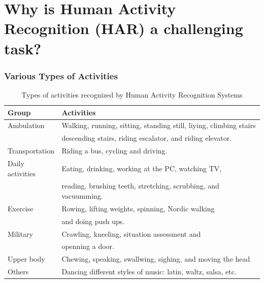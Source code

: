 \documentclass[
first,
ETH1,
navigation
]{ETHbeamerclass}
\begin{document}
\section{Why is Human Activity Recognition (HAR) a challenging task?} %

% 
% 


\begin{frame}
\frametitle{Various Types of Activities}

\begin{table}[h]
\label{t:typesofHAR}
\scriptsize{
\begin{tabular}{|l|l |}
\hline
\textbf{Group }& \textbf{Activities} \\ \hline
Ambulation & Walking, running, sitting, standing still, liying, climbing stairs \\ 
           & descending stairs, riding escalator, and riding elevator. \\ \hline
Transportation & Riding a bus, cycling and driving. \\ \hline
Daily activities & Eating, drinking, working at the PC, watching TV,\\ 
              & reading, brushing teeth, stretching, scrubbing, and vacuumming. \\ \hline
Exercise & Rowing, lifting weights, spinning, Nordic walking \\ 
       & and doing push ups. \\ \hline
Military & Crawling, kneeling, situation assessment and  \\ 
          & openning a door. \\ \hline
Upper body & Chewing, speaking, swallwing, sighing, and moving the head\\ \hline  
Others & Dancing different styles of music: latin, waltz, salsa, etc. \\ \hline  
\end{tabular}}
\caption{Types of activities recognized by Human Activity Recognition
Systems}
\end{table}

\end{frame}
\end{document}
